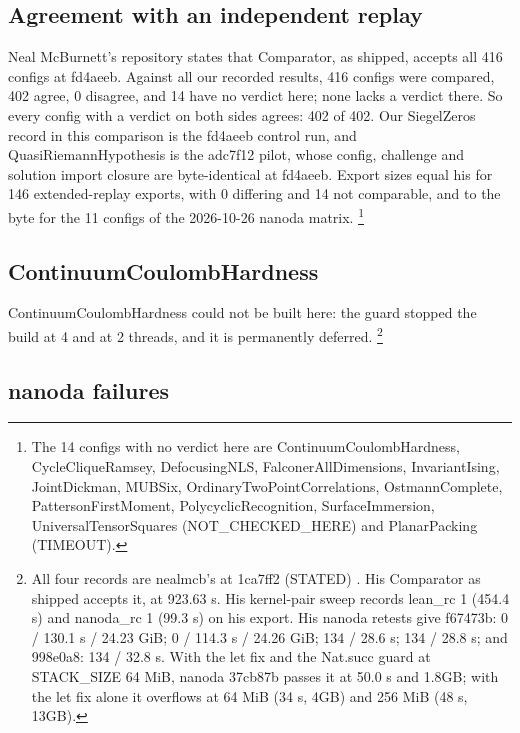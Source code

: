 \subsection{Agreement with an independent replay}

Neal McBurnett's repository \cite{mcburnett-tooling} states that Comparator, as shipped, accepts all 416 configs at fd4aeeb.
Against all our recorded results, 416 configs were compared, 402 agree, 0 disagree, and 14 have no verdict here; none lacks a verdict there.
So every config with a verdict on both sides agrees: 402 of 402.
Our SiegelZeros record in this comparison is the fd4aeeb control run, and QuasiRiemannHypothesis is the adc7f12 pilot, whose config, challenge and solution import closure are byte-identical at fd4aeeb.
Export sizes equal his for 146 extended-replay exports, with 0 differing and 14 not comparable, and to the byte for the 11 configs of the 2026-10-26 nanoda matrix.
\footnote{The 14 configs with no verdict here are ContinuumCoulombHardness, CycleCliqueRamsey, DefocusingNLS, FalconerAllDimensions, InvariantIsing, JointDickman, MUBSix, OrdinaryTwoPointCorrelations, OstmannComplete, PattersonFirstMoment, PolycyclicRecognition, SurfaceImmersion, UniversalTensorSquares (NOT\_CHECKED\_HERE) and PlanarPacking (TIMEOUT).
}

\subsection{ContinuumCoulombHardness}

ContinuumCoulombHardness could not be built here: the guard stopped the build at 4 and at 2 threads, and it is permanently deferred.
\footnote{All four records are nealmcb's at 1ca7ff2 (STATED) \cite{mcburnett-tooling}. His Comparator as shipped accepts it, at 923.63 s.
His kernel-pair sweep records lean\_rc 1 (454.4 s) and nanoda\_rc 1 (99.3 s) on his export.
His nanoda retests give f67473b: 0 / 130.1 s / 24.23 GiB; 0 / 114.3 s / 24.26 GiB; 134 / 28.6 s; 134 / 28.8 s; and 998e0a8: 134 / 32.8 s.
With the let fix and the Nat.succ guard at STACK\_SIZE 64 MiB, nanoda 37cb87b passes it at 50.0 s and 1.8GB; with the let fix alone it overflows at 64 MiB (34 s, 4GB) and 256 MiB (48 s, 13GB).
}

\subsection{nanoda failures}

